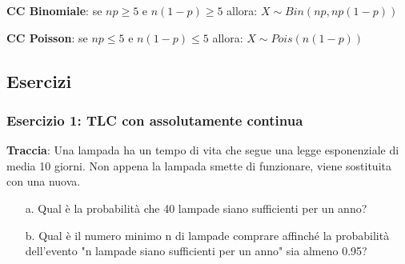 \ind \textbf{CC Binomiale}: se $np \geq 5$ e $n(1 - p) \geq 5$ allora: $X \sim Bin (np, np(1 - p))$ \n

\ind \textbf{CC Poisson}: se $np \leq 5$ e $n(1 - p) \leq 5$ allora: $X \sim Pois(n(1 - p))$

\subsection{Esercizi} 

\subsubsection{Esercizio 1: TLC con assolutamente continua}

\textbf{Traccia}: Una lampada ha un tempo di vita che segue una legge esponenziale di media 10 giorni. Non appena la lampada smette di funzionare, viene sostituita con una nuova. 
\begin{enumerate}
    \item [a. ] Qual è la probabilità che 40 lampade siano sufficienti per un anno?
    \item [b. ] Qual è il numero minimo n di lampade comprare affinché la probabilità dell'evento "n lampade siano sufficienti per un anno" sia almeno 0.95?
\end{enumerate} 


